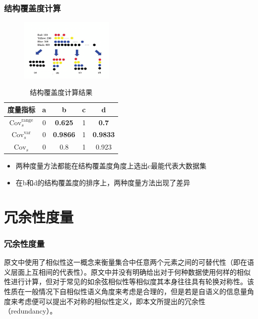 \documentclass{../presentation}
\newcommand{\Cov}{\text{Cov}}
\begin{document}
    \begin{frame}
        \frametitle{结构覆盖度计算}

        \begin{minipage}{0.3\linewidth}
            \begin{figure}
                \includegraphics[height=3cm]{pre03-imgs/1.png}
            \end{figure}
        \end{minipage}\hspace{1cm}
        \medskip
        \begin{minipage}{0.5\linewidth}
            \begin{table}[ht]
                \centering
                \caption{结构覆盖度计算结果}
                \begin{tabular}{ccccc}
                    \toprule
                    度量指标 & a & b & c & d \\
                    \midrule
                    $\Cov_s^\text{range}$ & 0 & \textbf{0.625} & 1 & \textbf{0.7} \\
                    $\Cov_s^\text{var}$ & 0 & \textbf{0.9866} & 1 & \textbf{0.9833} \\
                    $\Cov_s$ & 0 & 0.8 & 1 & 0.923 \\
                    \bottomrule
                \end{tabular}
            \end{table}
        \end{minipage}

        \begin{itemize}
            \item 两种度量方法都能在结构覆盖度角度上选出c最能代表大数据集
            \item 在b和d的结构覆盖度的排序上，两种度量方法出现了差异
        \end{itemize}
    \end{frame}

    \section{冗余性度量}
    \begin{frame}
        \frametitle{冗余性度量}

        原文中使用了相似性这一概念来衡量集合中任意两个元素之间的可替代性（即在语义层面上互相间的代表性）。原文中并没有明确给出对于何种数据使用何样的相似性进行计算，但对于常见的如余弦相似性等相似度其本身往往具有轮换对称性。该性质在一般情况下自相似性语义角度来考虑是合理的，但是若是自语义的信息量角度来考虑便可以提出不对称的相似性定义，即本文所提出的冗余性（redundancy）。

    \end{frame}
\end{document}

